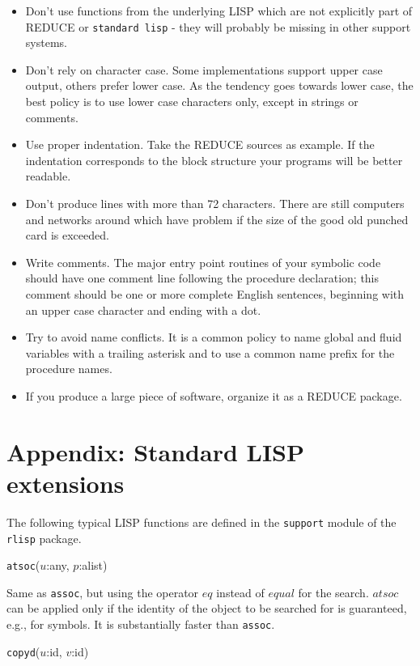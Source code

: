 \documentclass[11pt]{article}
\newcommand{\reduce}{\small REDUCE}
\begin{document}
\begin{itemize}
\item Don't use functions from the underlying LISP which are
  not explicitly part of {\reduce} or \texttt{standard lisp}
  - they will probably be missing in other support systems.
\item Don't rely on character case.
  Some implementations support upper case
  output, others prefer lower case. As the tendency goes
  towards lower case, the best policy is to use lower
  case characters only, except in strings or comments.
\item Use proper indentation. Take the {\reduce}
  sources as example. If the indentation corresponds
  to the block structure your programs will be better
  readable.
\item Don't produce lines with more than 72 characters.
  There are still computers and networks around which
  have problem if the size of the good old punched card
  is exceeded.
\item Write comments. The major entry point routines of your
  symbolic code should have one comment line following the
  procedure declaration; this comment should be one or more
  complete English sentences, beginning with an upper case
  character and ending with a dot.
\item Try to avoid name conflicts. It is a common policy to
  name global and fluid variables with a trailing asterisk
  and to use a common name prefix for the procedure names.
\item If you produce a large piece of software, organize it as
  a {\reduce} package.
\end{itemize}


\section{Appendix: Standard LISP extensions}

The following typical LISP functions are defined in the \texttt{support}
module of the \texttt{rlisp}  package.

\vspace{5mm}
\texttt{atsoc}($u$:any, $p$:alist)

\noindent
Same as \texttt{assoc}, but using the operator $eq$ instead of $equal$
for the search. $atsoc$ can be applied only if the identity
of the object to be searched for is guaranteed, e.g.,  for symbols.
It is substantially faster than \texttt{assoc}.

\vspace{5mm}
\texttt{copyd}($u$:id, $v$:id)
\end{document}

